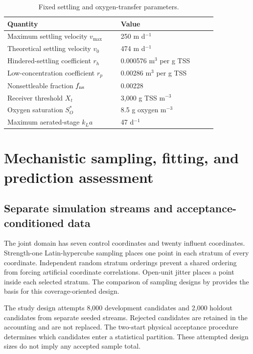 \begin{table}[htbp]
\centering\small
\caption{Fixed settling and oxygen-transfer parameters.}
\label{tab:plant_settling_constants}
\begin{tabular}{p{0.46\linewidth}p{0.39\linewidth}}
\toprule Quantity & Value\\\midrule
Maximum settling velocity $v_{\max}$ & 250 m d$^{-1}$\\
Theoretical settling velocity $v_0$ & 474 m d$^{-1}$\\
Hindered-settling coefficient $r_h$ & 0.000576 m$^3$ per g TSS\\
Low-concentration coefficient $r_p$ & 0.00286 m$^3$ per g TSS\\
Nonsettleable fraction $f_{\rm ns}$ & 0.00228\\
Receiver threshold $X_t$ & 3{,}000 g TSS m$^{-3}$\\
Oxygen saturation $S_O^*$ & 8.5 g oxygen m$^{-3}$\\
Maximum aerated-stage $k_La$ & 47 d$^{-1}$\\
\bottomrule
\end{tabular}
\end{table}

\section{Mechanistic sampling, fitting, and prediction assessment}

\subsection{Separate simulation streams and acceptance-conditioned data}

The joint domain has seven control coordinates and twenty influent coordinates. Strength-one Latin-hypercube sampling places one point in each stratum of every coordinate. Independent random stratum orderings prevent a shared ordering from forcing artificial coordinate correlations. Open-unit jitter places a point inside each selected stratum. The comparison of sampling designs by \citet{McKay1979} provides the basis for this coverage-oriented design.

The study design attempts 8{,}000 development candidates and 2{,}000 holdout candidates from separate seeded streams. Rejected candidates are retained in the accounting and are not replaced. The two-start physical acceptance procedure determines which candidates enter a statistical partition. These attempted design sizes do not imply any accepted sample total.

